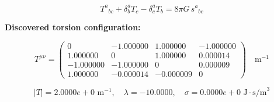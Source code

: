 
\begin{equation}
  T^a{}_{bc} + \delta^a_b T_c - \delta^a_c T_b = 8\pi G \, s^a{}_{bc}
\end{equation}

\textbf{Discovered torsion configuration:}

\begin{equation}
  T^{\mu\nu} = \begin{pmatrix}
    0 & -1.000000 & 1.000000 & -1.000000 \\
    1.000000 & 0 & 1.000000 & 0.000014 \\
    -1.000000 & -1.000000 & 0 & 0.000009 \\
    1.000000 & -0.000014 & -0.000009 & 0
  \end{pmatrix} \quad \text{m}^{-1}
\end{equation}

\begin{equation}
  |T| = 2.0000e+0 \text{ m}^{-1}, \quad
  \lambda = -10.0000, \quad
  \sigma = 0.0000e+0 \text{ J}\cdot\text{s/m}^3
\end{equation}